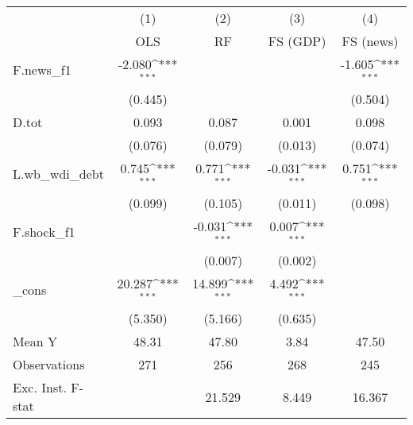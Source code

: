 {
\def\sym#1{\ifmmode^{#1}\else\(^{#1}\)\fi}
\begin{tabular}{l*{4}{c}}
\toprule
            &\multicolumn{1}{c}{(1)}&\multicolumn{1}{c}{(2)}&\multicolumn{1}{c}{(3)}&\multicolumn{1}{c}{(4)}\\
            &\multicolumn{1}{c}{OLS}&\multicolumn{1}{c}{RF}&\multicolumn{1}{c}{FS (GDP)}&\multicolumn{1}{c}{FS (news)}\\
\midrule
F.news\_f1   &      -2.080\sym{***}&                     &                     &      -1.605\sym{***}\\
            &     (0.445)         &                     &                     &     (0.504)         \\
\addlinespace
D.tot       &       0.093         &       0.087         &       0.001         &       0.098         \\
            &     (0.076)         &     (0.079)         &     (0.013)         &     (0.074)         \\
\addlinespace
L.wb\_wdi\_debt&       0.745\sym{***}&       0.771\sym{***}&      -0.031\sym{***}&       0.751\sym{***}\\
            &     (0.099)         &     (0.105)         &     (0.011)         &     (0.098)         \\
\addlinespace
F.shock\_f1  &                     &      -0.031\sym{***}&       0.007\sym{***}&                     \\
            &                     &     (0.007)         &     (0.002)         &                     \\
\addlinespace
\_cons      &      20.287\sym{***}&      14.899\sym{***}&       4.492\sym{***}&                     \\
            &     (5.350)         &     (5.166)         &     (0.635)         &                     \\
\midrule
Mean Y      &       48.31         &       47.80         &        3.84         &       47.50         \\
Observations&         271         &         256         &         268         &         245         \\
Exc. Inst. F-stat&                     &      21.529         &       8.449         &      16.367         \\
\bottomrule
\end{tabular}
}
